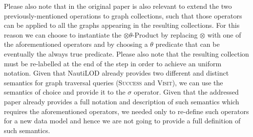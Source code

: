 Please also note that in the original paper is also relevant to extend the two previously-mentioned operations to graph collections, such that those operators can be applied to all the graphs appearing in the resulting collections. For this reason we can choose to instantiate the $\otimes\theta$-Product by replacing $\otimes$ with one of the aforementioned operators and by choosing a $\theta$ predicate that can be eventually the always true predicate. Please also note that the resulting collection must be re-labelled at the end of the step in order to achieve an uniform notation. Given that NautiLOD already provides two different and distinct semantics for graph traversal queries (\textsc{Success} and \textsc{Visit}), we can use the semantics of choice and provide it to the $\sigma$ operator. Given that the addressed paper already provides a full notation and description of such semantics which requires the aforementioned operators, we needed only to re-define such operators for a new data model and hence we are not going to provide a full definition of such semantics.

